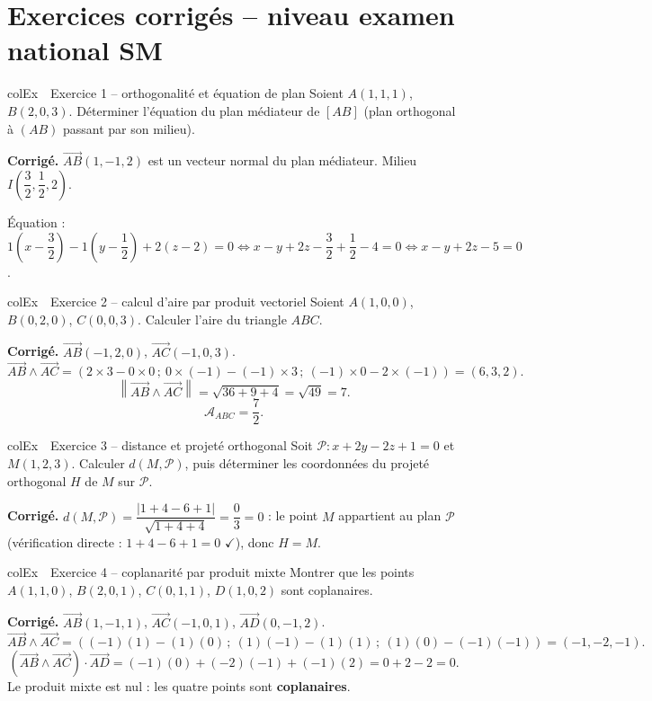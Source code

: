 \documentclass[11pt,a4paper]{article}
\newenvironment{exemple}[1][Exemple]
  {\begin{fiche}{colEx}{\ding{217}~~#1}}{\end{fiche}}
\begin{document}
\section{Exercices corrigés -- niveau examen national SM}

\begin{exemple}[Exercice 1 -- orthogonalité et équation de plan]
Soient $A(1,1,1)$, $B(2,0,3)$. Déterminer l'équation du plan médiateur de $[AB]$ (plan orthogonal à $(AB)$ passant par son milieu).

\smallskip
\textbf{Corrigé.} $\overrightarrow{AB}(1,-1,2)$ est un vecteur normal du plan médiateur. Milieu $I\left(\dfrac32,\dfrac12,2\right)$.

\smallskip
Équation : $1\left(x-\dfrac32\right)-1\left(y-\dfrac12\right)+2(z-2)=0 \iff x-y+2z-\dfrac{3}{2}+\dfrac12-4=0 \iff x-y+2z-5=0$.
\end{exemple}

\begin{exemple}[Exercice 2 -- calcul d'aire par produit vectoriel]
Soient $A(1,0,0)$, $B(0,2,0)$, $C(0,0,3)$. Calculer l'aire du triangle $ABC$.

\smallskip
\textbf{Corrigé.} $\overrightarrow{AB}(-1,2,0)$, $\overrightarrow{AC}(-1,0,3)$.
\[
  \overrightarrow{AB}\wedge\overrightarrow{AC} = (2\times3-0\times0\,;\ 0\times(-1)-(-1)\times3\,;\ (-1)\times0-2\times(-1)) = (6,3,2).
\]
\[
  \left\|\overrightarrow{AB}\wedge\overrightarrow{AC}\right\| = \sqrt{36+9+4} = \sqrt{49} = 7.
\]
\[
  \mathcal{A}_{ABC} = \frac72.
\]
\end{exemple}

\begin{exemple}[Exercice 3 -- distance et projeté orthogonal]
Soit $\mathcal{P}:x+2y-2z+1=0$ et $M(1,2,3)$. Calculer $d(M,\mathcal{P})$, puis déterminer les coordonnées du projeté orthogonal $H$ de $M$ sur $\mathcal{P}$.

\smallskip
\textbf{Corrigé.} $d(M,\mathcal{P}) = \dfrac{|1+4-6+1|}{\sqrt{1+4+4}} = \dfrac{0}{3} = 0$ : le point $M$ appartient au plan $\mathcal{P}$ (vérification directe : $1+4-6+1=0$ $\checkmark$), donc $H=M$.
\end{exemple}

\begin{exemple}[Exercice 4 -- coplanarité par produit mixte]
Montrer que les points $A(1,1,0)$, $B(2,0,1)$, $C(0,1,1)$, $D(1,0,2)$ sont coplanaires.

\smallskip
\textbf{Corrigé.} $\overrightarrow{AB}(1,-1,1)$, $\overrightarrow{AC}(-1,0,1)$, $\overrightarrow{AD}(0,-1,2)$.
\[
  \overrightarrow{AB}\wedge\overrightarrow{AC} = ((-1)(1)-(1)(0)\,;\ (1)(-1)-(1)(1)\,;\ (1)(0)-(-1)(-1)) = (-1,-2,-1).
\]
\[
  (\overrightarrow{AB}\wedge\overrightarrow{AC})\cdot\overrightarrow{AD} = (-1)(0)+(-2)(-1)+(-1)(2) = 0+2-2 = 0.
\]
Le produit mixte est nul : les quatre points sont \textbf{coplanaires}.
\end{exemple}
\end{document}
